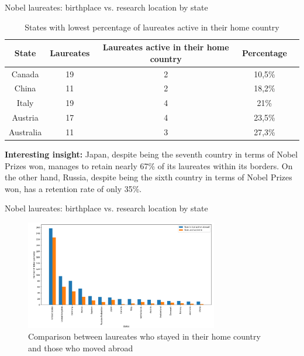 \documentclass[aspectratio=169,xcolor=dvipsnames]{beamer}
\begin{document}
\begin{frame}{Nobel laureates: birthplace vs. research location by state}
	\vspace{-1em}
	\begin{table}[h!]
		\centering
		\caption{States with lowest percentage of laureates active in their home country}
		\begin{tabular}{|c|c|c|c|c|}
			\hline
			\textbf{State} & \textbf{Laureates} & \textbf{Laureates active in their home country} & \textbf{Percentage} \\ \hline
			Canada         & 19                 & 2                                               & 10,5\%              \\ \hline
			China          & 11                 & 2                                               & 18,2\%              \\ \hline
			Italy          & 19                 & 4                                               & 21\%                \\ \hline
			Austria        & 17                 & 4                                               & 23,5\%              \\ \hline
			Australia      & 11                 & 3                                               & 27,3\%              \\ \hline
		\end{tabular}
		\label{tab:laureates_active}
	\end{table}

	\textbf{Interesting insight:} Japan, despite being the seventh country in terms of Nobel
Prizes won, manages to retain nearly 67\% of its laureates within its borders. On the other hand, Russia, despite
being the sixth country in terms of Nobel Prizes won, has a retention rate of only 35\%.

\end{frame}

\begin{frame}{Nobel laureates: birthplace vs. research location by state}
	\begin{figure}[H]
		\centering
		\includegraphics[width=0.75\textwidth]{../queries/plots/laureatesComparison.png}
		\caption{Comparison between laureates who stayed in their home country and those who moved abroad}
		\label{fig:laureatesComparison}
	\end{figure}
\end{frame}
\end{document}

